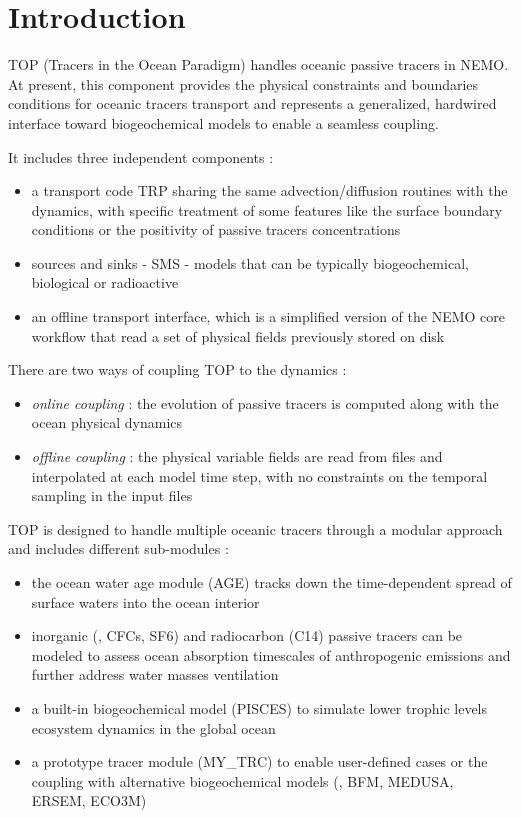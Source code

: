 
\chapter*{Introduction}

TOP (Tracers in the Ocean Paradigm) handles oceanic passive tracers in NEMO. At present, this component provides the physical constraints and boundaries conditions for oceanic tracers transport and represents a generalized, hardwired interface toward biogeochemical models to enable a seamless coupling.

It includes three independent components :

\begin{itemize}
        \item a transport code TRP sharing the same advection/diffusion routines with the dynamics, with specific treatment of some features like the surface boundary
conditions or the positivity of passive tracers concentrations
        \item sources and sinks - SMS - models that can be typically biogeochemical, biological or radioactive
        \item an offline transport interface, which is a simplified version of the NEMO core workflow that read a set of physical fields previously stored on disk
\end{itemize}

There are two ways of coupling TOP to the dynamics :

\begin{itemize}
        \item \textit{online coupling} : the evolution of passive tracers is computed along with the ocean physical dynamics
        \item \textit{offline coupling} : the physical variable fields are read from files and interpolated at each model time step, with no constraints on the temporal sampling in the input files
\end{itemize}

TOP is designed to handle multiple oceanic tracers through a modular approach and includes different sub-modules :

\begin{itemize}
        \item the ocean water age module (AGE) tracks down the time-dependent spread of surface waters into the ocean interior
        \item inorganic (\eg, CFCs, SF6) and radiocarbon (C14) passive tracers can be modeled to assess ocean absorption timescales of anthropogenic emissions and further address water masses ventilation
        \item a built-in biogeochemical model (PISCES) to simulate lower trophic levels ecosystem dynamics in the global ocean
        \item a prototype tracer module (MY\_TRC) to enable user-defined cases or the coupling with alternative biogeochemical models (\eg, BFM, MEDUSA, ERSEM, ECO3M)
\end{itemize}

